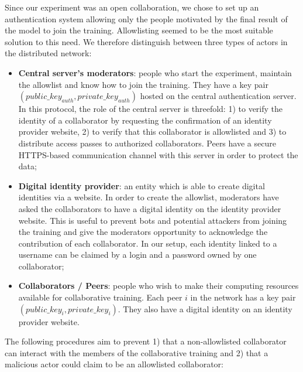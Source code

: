 Since our experiment was an open collaboration, we chose to set up an authentication system allowing only the people motivated by the final result of the model to join the training. Allowlisting seemed to be the most suitable solution to this need. We therefore distinguish between three types of actors in the distributed network:
\begin{itemize}[leftmargin=*]
    \item \textbf{Central server's moderators}: people who start the experiment, maintain the allowlist and know how to join the training. They have a key pair $(public\_key_{auth}, private\_key_{auth})$ hosted on the central authentication server. In this protocol, the role of the central server is threefold: 1) to verify the identity of a collaborator by requesting the confirmation of an identity provider website, 2) to verify that this collaborator is allowlisted and 3) to distribute access passes to authorized collaborators. Peers have a secure HTTPS-based communication channel with this server in order to protect the data;
    \item \textbf{Digital identity provider}: an entity which is able to create digital identities via a website. In order to create the allowlist, moderators have asked the collaborators to have a digital identity on the identity provider website. This is useful to prevent bots and potential attackers from joining the training and give the moderators opportunity to acknowledge the contribution of each collaborator. In our setup, each identity linked to a username can be claimed by a login and a password owned by one collaborator;
    \item \textbf{Collaborators / Peers}: people who wish to make their computing resources available for collaborative training. Each peer $i$ in the network has a key pair $(public\_key_i, private\_key_i)$. They also have a digital identity on an identity provider website.
\end{itemize}
The following procedures aim to prevent 1) that a non-allowlisted collaborator can interact with the members of the collaborative training and 2) that a malicious actor could claim to be an allowlisted collaborator:

